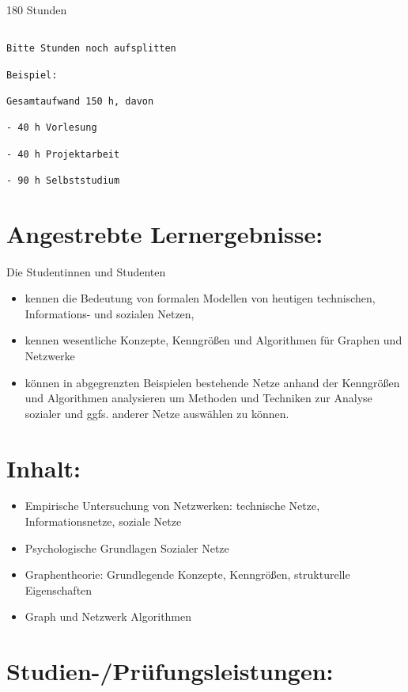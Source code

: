 180 Stunden

\begin{verbatim}

Bitte Stunden noch aufsplitten

Beispiel:

Gesamtaufwand 150 h, davon 

- 40 h Vorlesung 

- 40 h Projektarbeit  

- 90 h Selbststudium 
\end{verbatim}

\section*{Angestrebte
Lernergebnisse:}\label{angestrebte-lernergebnisse-11}

Die Studentinnen und Studenten

\begin{itemize}
\item
  kennen die Bedeutung von formalen Modellen von heutigen technischen,
  Informations- und sozialen Netzen,
\item
  kennen wesentliche Konzepte, Kenngrößen und Algorithmen für Graphen
  und Netzwerke
\item
  können in abgegrenzten Beispielen bestehende Netze anhand der
  Kenngrößen und Algorithmen analysieren um Methoden und Techniken zur
  Analyse sozialer und ggfs. anderer Netze auswählen zu können.
\end{itemize}

\section*{Inhalt:}\label{inhalt-11}

\begin{itemize}
\item
  Empirische Untersuchung von Netzwerken: technische Netze,
  Informationsnetze, soziale Netze
\item
  Psychologische Grundlagen Sozialer Netze
\item
  Graphentheorie: Grundlegende Konzepte, Kenngrößen, strukturelle
  Eigenschaften
\item
  Graph und Netzwerk Algorithmen
\end{itemize}

\section*{Studien-/Prüfungsleistungen:}\label{studien-pruxfcfungsleistungen-11}

